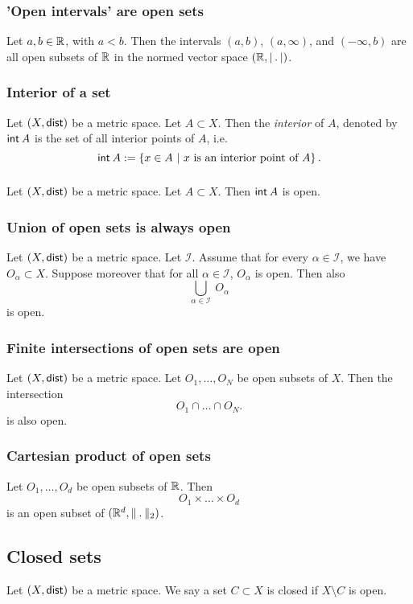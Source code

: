 \subsubsection*{'Open intervals' are open sets}
\uprop Let $a, b \in \mathbb{R}$, with $a < b$. Then the intervals $(a,b)$, $(a, \infty)$, and
$(-\infty, b)$ are all open subsets of $\mathbb{R}$ in the normed vector space
$(\R, \normR)$.

\subsubsection*{Interior of a set}
Let $(X, \mathsf{dist})$ be a metric space. Let $A \subset X$. Then the \emph{interior}
of $A$, denoted by $\setint A$ is the set of all interior points of $A$, i.e.
\[
    \setint A := \left\{ x \in A\ \middle|\ x \text{ is an interior point of } A \right\}.
\]

\subsubsection*{}
\uprop Let $(X, \mathsf{dist})$ be a metric space. Let $A \subset X$. Then $\setint A$
is open.

\subsubsection*{Union of open sets is always open}
\uthm Let $(X, \mathsf{dist})$ be a metric space. Let $\mathcal{I}$.
Assume that for every $\alpha \in \mathcal{I}$, we have $O_\alpha \subset X$.
Suppose moreover that for all $\alpha \in \mathcal{I}$, $O_\alpha$ is open.
Then also
\[
    \bigcup_{\alpha \in \mathcal{I}}\ O_\alpha
\]
is open.

\subsubsection*{Finite intersections of open sets are open}
\uprop Let $(X, \mathsf{dist})$ be a metric space. Let $O_1, \dots, O_N$ be open subsets
of $X$. Then the intersection
\[
    O_1 \cap \dots \cap O_N.
\]
is also open.

\subsubsection*{Cartesian product of open sets}
Let $O_1, \dots, O_d$ be open subsets of $\mathbb{R}$. Then
\[
    O_1 \times \dots \times O_d
\]
is an open subset of $(\R^d, \norm_2)$.

\subsection{Closed sets}
\udef Let $(X, \mathsf{dist})$ be a metric space. We say a set $C \subset X$ is closed
if $X \setminus C$ is open.

